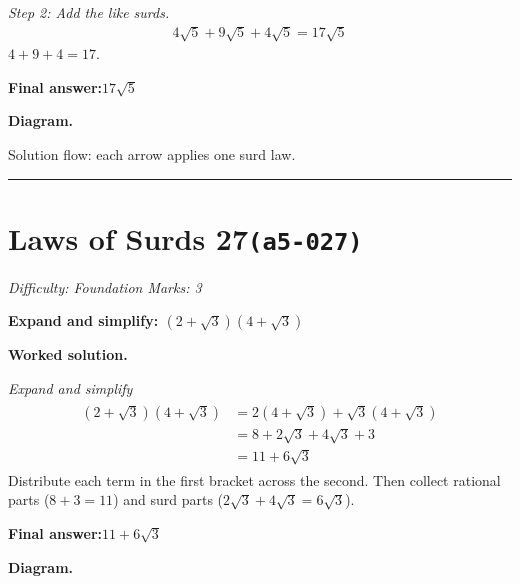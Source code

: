 \documentclass[11pt]{article}
\newcommand{\question}[1]{\par\medskip\noindent\textbf{#1}\par}
\begin{document}
\textit{Step 2: Add the like surds.}
\[\begin{gathered}
4\sqrt{5} + 9\sqrt{5} + 4\sqrt{5} = 17\sqrt{5}
\end{gathered}\]
\( 4 + 9 + 4 = 17 \).

\begin{answerbox}
\textbf{Final answer:}\quad \(\displaystyle 17\sqrt{5}\)
\end{answerbox}
\textbf{Diagram.}

\begin{center}
\end{center}
\small Solution flow: each arrow applies one surd law.\normalsize

\medskip\hrule

\section*{Laws of Surds 27\quad\small\texttt{(a5-027)}}
\textit{Difficulty: Foundation \quad\textbar\quad Marks: 3}

\question{Expand and simplify: \( (2 + \sqrt{3})(4 + \sqrt{3}) \)}

\textbf{Worked solution.}

\textit{Expand and simplify}
\[\begin{gathered}
\begin{aligned} (2+\sqrt{3})(4+\sqrt{3}) &= 2(4+\sqrt{3})+\sqrt{3}(4+\sqrt{3}) \\ &= 8+2\sqrt{3}+4\sqrt{3}+3 \\ &= 11 + 6\sqrt{3} \end{aligned}
\end{gathered}\]
Distribute each term in the first bracket across the second. Then collect rational parts (\(8+3=11\)) and surd parts (\(2\sqrt{3}+4\sqrt{3}=6\sqrt{3}\)).

\begin{answerbox}
\textbf{Final answer:}\quad \(\displaystyle 11 + 6\sqrt{3}\)
\end{answerbox}
\textbf{Diagram.}
\end{document}
